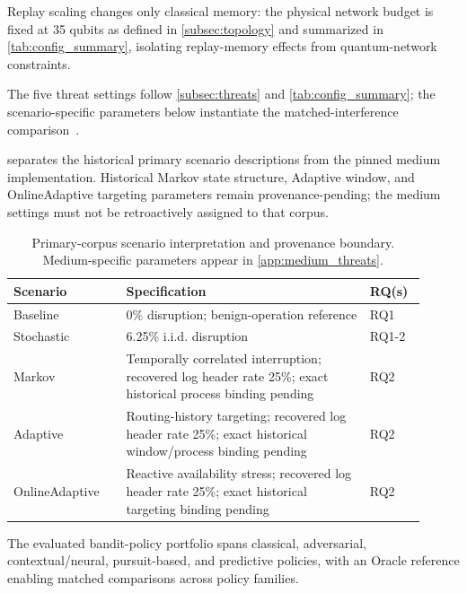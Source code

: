 Replay scaling changes only classical memory: the physical network budget is fixed at 35 qubits as defined in \cref{subsec:topology} and summarized in \cref{tab:config_summary}, isolating replay-memory effects from quantum-network constraints.

The five threat settings follow \cref{subsec:threats} and \cref{tab:config_summary}; the scenario-specific parameters below instantiate the matched-interference comparison~\cite{huang2024quantum}.

 separates the historical primary scenario descriptions from the pinned medium implementation. Historical Markov state structure, Adaptive window, and OnlineAdaptive targeting parameters remain provenance-pending; the medium settings must not be retroactively assigned to that corpus.

\begin{table}[ht!]
\footnotesize
\centering
\setlength{\tabcolsep}{4pt}
\caption{Primary-corpus scenario interpretation and provenance boundary. Medium-specific parameters appear in \cref{app:medium_threats}.}
\label{tab:scenario_specs}
\begin{tabular}{@{}p{0.25\linewidth} p{0.54\linewidth} p{0.12\linewidth}@{}}
\toprule
\textbf{Scenario} & \textbf{Specification} & \textbf{RQ(s)} \\
\midrule
Baseline & 0\% disruption; benign-operation reference & RQ1 \\
Stochastic & 6.25\% i.i.d. disruption~\cite{huang2024quantum} & RQ1-2 \\
Markov & Temporally correlated interruption; recovered log header rate 25\%; exact historical process binding pending & RQ2 \\
Adaptive & Routing-history targeting; recovered log header rate 25\%; exact historical window/process binding pending & RQ2 \\
OnlineAdaptive & Reactive availability stress; recovered log header rate 25\%; exact historical targeting binding pending & RQ2 \\
\bottomrule
\end{tabular}
\end{table}

The evaluated bandit-policy portfolio spans classical, adversarial, contextual/neural, pursuit-based, and predictive policies, with an Oracle reference enabling matched comparisons across policy families.

